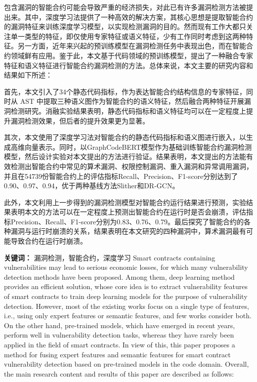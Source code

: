 \cleardoublepage
{}
包含漏洞的智能合约可能会导致严重的经济损失，对此已有许多漏洞检测方法被提出来。其中，深度学习法提供了一种高效的解决方案，其核心思想是提取智能合约的漏洞特征来训练深度学习模型，以实现检测漏洞的目的。然而现有工作大都只关注单一类型的特征，即仅使用专家特征或语义特征，少有工作同时考虑到这两种特征。另一方面，近年来兴起的预训练模型在漏洞检测任务中表现出色，而在智能合约领域鲜有应用。鉴于此，本文基于代码领域的预训练模型，提出了一种融合专家特征和语义特征进行智能合约漏洞检测的方法。总体来说，本文主要的研究内容和结果如下所述：

首先，本文引入了34个静态代码指标，作为表达智能合约结构信息的专家特征，同时从 AST 中提取三种语义图作为智能合约的语义特征，然后融合两种特征开展漏洞检测研究。消融实验结果表明，静态代码指标和语义特征均可以在一定程度上提升漏洞检测效果，但后者的提升效果更为显著。

其次，本文使用了深度学习法对智能合约的静态代码指标和语义图进行嵌入，以生成高维向量表示。同时，以GraphCodeBERT模型作为基础训练智能合约漏洞检测模型，然后设计实验对本文提出的方法进行验证。结果表明，本文提出的方法能有效检测出智能合约中常见的算术漏洞、权限控制漏洞、重入漏洞和异常调用漏洞，并且在\num{54739}份智能合约上的评估指标Recall、Precision、F1-score分别达到了0.90、0.97、0.94，优于两种基线方法Slither和DR-GCN。
    
此外，本文利用上一步得到的漏洞检测模型对智能合约运行结果进行预测，实验结果表明本文的方法可以在一定程度上预测出智能合约在运行时是否会崩溃，评估指标Precision、Recall、F1-score分别为0.83、0.76、0.79。最后探究了智能合约的各种漏洞与运行时崩溃的关系，结果表明在本文研究的四种漏洞中，算术漏洞最有可能导致合约在运行时崩溃。


\hspace*{\fill}

\noindent \textbf{关键词：} 漏洞检测，智能合约，深度学习
\cleardoublepage
{}
Smart contracts containing vulnerabilities may lead to serious economic losses, for which many vulnerability detection methods have been proposed. Among them, deep learning method provides an efficient solution, whose core idea is to extract vulnerability features of smart contracts to train deep learning models for the purpose of vulnerability detection. However, most of the existing works focus on a single type of features, i.e., using only expert features or semantic features, and few works consider both. On the other hand, pre-trained models, which have emerged in recent years, perform well in vulnerability detection tasks, whereas they have rarely been applied in the field of smart contracts. In view of this, this paper proposes a method for fusing expert features and semantic features for smart contract vulnerability detection based on pre-trained models in the code domain. Overall, the main research content and results of this paper are described as follows:

